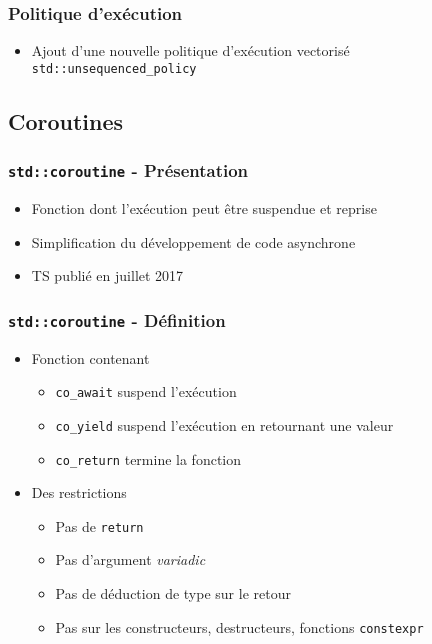 \documentclass[C++.tex]{subfiles}
\begin{document}
\begin{frame}[fragile]
	\frametitle{Politique d'exécution}
	\begin{itemize}
		\item Ajout d'une nouvelle politique d'exécution vectorisé \lstinline|std::unsequenced_policy|
	\end{itemize}
\end{frame}

\subsection*{Coroutines}
\begin{frame}[fragile]
	\frametitle{\lstinline|std::coroutine| - Présentation}
	\begin{itemize}
		\item Fonction dont l'exécution peut être suspendue et reprise
		\item Simplification du développement de code asynchrone
		\item TS publié en juillet 2017
	\end{itemize}
\end{frame}

\begin{frame}[fragile]
	\frametitle{\lstinline|std::coroutine| - Définition}
	\begin{itemize}
		\item Fonction contenant
		\begin{itemize}
			\item \lstinline|co_await| suspend l'exécution
			\item \lstinline|co_yield| suspend l'exécution en retournant une valeur
			\item \lstinline|co_return| termine la fonction
		\end{itemize}

		\item Des restrictions
		\begin{itemize}
			\item Pas de \lstinline|return|
			\item Pas d'argument \textit{variadic}
			
			
			\item Pas de déduction de type sur le retour
			
			
			\item Pas sur les constructeurs, destructeurs, fonctions \lstinline|constexpr|
		\end{itemize}

	\end{itemize}
\end{frame}
\end{document}
